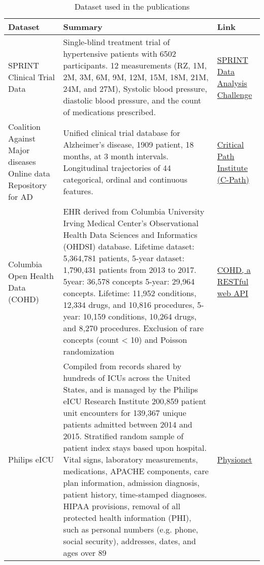 \begin{table}[H]
    \scriptsize
    \caption{Dataset used in the publications\label{tab:datasets}}
    \begin{tabular}{@{}p{} p{}p{}@{}}\toprule
    Dataset & Summary & Link\\\midrule
    
    SPRINT Clinical Trial Data \cite{wright2016randomized} 
    &  Single-blind treatment trial of hypertensive patients with 6502 participants. 12 measurements (RZ, 1M, 2M, 3M, 6M, 9M, 12M, 15M, 18M, 21M, 24M, and 27M), Systolic blood pressure, diastolic blood pressure, and the count of medications prescribed. 
    & \href{https://challenge.nejm.org/pages/home}{SPRINT Data Analysis Challenge}\\
    
    Coalition Against Major diseases Online data Repository for AD \cite{Neville_2015} 
    & Unified clinical trial database for Alzheimer’s disease, 1909 patient, 18 months, at 3 month intervals. Longitudinal trajectories of 44 categorical, ordinal and continuous features. 
    & \href{https://c-path.org/programs/dcc/projects/alzheimers-disease/coalition-against-major-diseases-consortium-database-camd-admci/}{Critical Path Institute (C-Path)}\\
    
    Columbia Open Health Data (COHD) \cite{Ta_2018} &  EHR derived from Columbia University Irving Medical Center’s Observational Health Data Sciences and Informatics (OHDSI) database. Lifetime dataset: 5,364,781 patients, 5-year dataset: 1,790,431 patients from 2013 to 2017. 5year: 36,578 concepts 5-year: 29,964 concepts. Lifetime: 11,952 conditions, 12,334 drugs, and 10,816 procedures, 5-year: 10,159 conditions, 10,264 drugs, and 8,270 procedures.  Exclusion of rare concepts (count < 10) and Poisson randomization  & \href{http://cohd.io/}{COHD, a RESTful web API}\\

    Philips eICU \cite{pollard2018eicu} &    Compiled from records shared by hundreds of ICUs across the United States, and is managed by the Philips eICU Research Institute  200,859 patient unit encounters for 139,367 unique patients admitted between 2014 and 2015. Stratified random sample of patient index stays based upon hospital. Vital signs, laboratory measurements, medications, APACHE components, care plan information, admission diagnosis, patient history, time-stamped diagnoses.  HIPAA provisions, removal of all protected health information (PHI), such as personal numbers (e.g. phone, social security), addresses, dates, and ages over 89  & \href{https://physionet.org}{Physionet \cite{Goldberger_2000}}\\
    

\end{tabular}
\end{table}
